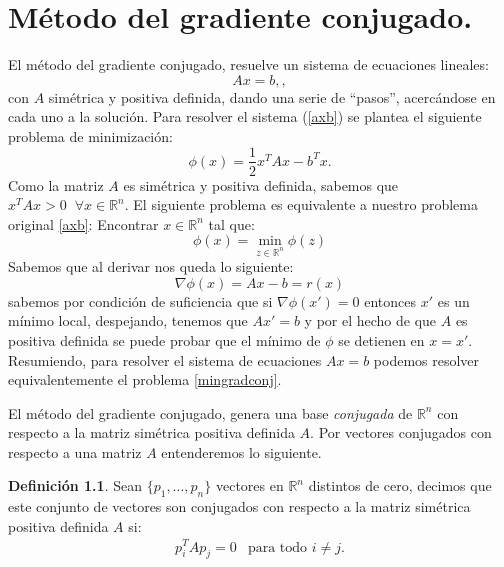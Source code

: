 \documentclass[12pt,spanish,oneside]{book}
\theoremstyle{plain}
\numberwithin{equation}{chapter}
\theoremstyle{definition}
\newtheorem{defi}{Definici\'{o}n}[chapter]
\theoremstyle{remark}
\newcommand{\re}{\mathbb{R}}
\begin{document}
\chapter{Método del gradiente conjugado.}\label{AN1}

El método del gradiente conjugado, resuelve un sistema de ecuaciones lineales:
\begin{equation}Ax=b,\label{axb},\end{equation}
con $A$ simétrica y positiva definida, dando una serie de ``pasos'', acercándose en cada uno a la solución. Para resolver el sistema (\ref{axb}) se plantea el siguiente problema de minimización: 
\[\phi(x)=\frac{1}{2} x^T Ax - b^Tx.\]
Como la matriz $A$ es simétrica y positiva definida, sabemos que $x^T Ax>0\phantom{\pi} \forall x \in \re^n $. El siguiente problema es equivalente a nuestro problema original \ref{axb}:
Encontrar $x\in \re^n$ tal que:
\begin{equation} \phi(x)= \min_{z\in\re^n} \phi (z) \label{mingradconj}
\end{equation}
Sabemos que al derivar nos queda lo siguiente: 
\[\nabla\phi(x)= Ax-b=r(x)\]
sabemos por condición de suficiencia que si $\nabla\phi(x')=0 $ entonces $x'$ es un mínimo local, despejando, tenemos que $Ax'=b$ y por el hecho de que $A$ es positiva definida se puede probar que el mínimo de $\phi$ se detienen en $x=x'$. Resumiendo, para resolver el sistema de ecuaciones $Ax=b$ podemos resolver equivalentemente el problema \ref{mingradconj}. 

El método del gradiente conjugado, genera una base \textit{conjugada} de $\re^n$ con respecto a la matriz simétrica positiva definida $A$. Por vectores conjugados con respecto a una matriz $A$ entenderemos lo siguiente. \begin{defi}Sean $\lbrace p_1,...,p_n\rbrace$ vectores en $\re^n$ distintos de cero, decimos que este conjunto de vectores son conjugados con respecto a la matriz simétrica positiva definida $A$ si:
\begin{eqnarray} 
p_i^TAp_j=0 & \text{para todo } i\neq j.
\end{eqnarray}
\end{defi}
\end{document}
